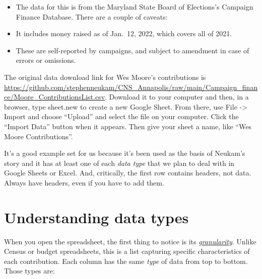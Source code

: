 \documentclass[
  letterpaper,
  DIV=11,
  numbers=noendperiod]{scrreprt}
\begin{document}
\begin{itemize}
\item
  The data for this is from the Maryland State Board of Elections's
  Campaign Finance Database. There are a couple of caveats:
\item
  It includes money raised as of Jan.~12, 2022, which covers all of
  2021.
\item
  These are self-reported by campaigns, and subject to amendment in case
  of errors or omissions.
\end{itemize}

The original data download link for Wes Moore's contributions is
\url{https://github.com/stephenneukam/CNS_Annapolis/raw/main/Campaign_finance/Moore_ContributionsList.csv}.
Download it to your computer and then, in a browser, type sheet.new to
create a new Google Sheet. From there, use File -\textgreater{} Import
and choose ``Upload'' and select the file on your computer. Click the
``Import Data'' button when it appears. Then give your sheet a name,
like ``Wes Moore Contributions''.

It's a good example set for us because it's been used as the basis of
Neukam's story and it has at least one of each \emph{data type} that we
plan to deal with in Google Sheets or Excel. And, critically, the first
row contains headers, not data. Always have headers, even if you have to
add them.

\hypertarget{understanding-data-types}{%
\section{Understanding data types}\label{understanding-data-types}}

When you open the spreadsheet, the first thing to notice is its
\href{start-data-def.html}{\emph{granularity}}. Unlike Census or budget
spreadsheets, this is a list capturing specific characteristics of each
contribution. Each column has the same \emph{type} of data from top to
bottom. Those types are:
\end{document}
